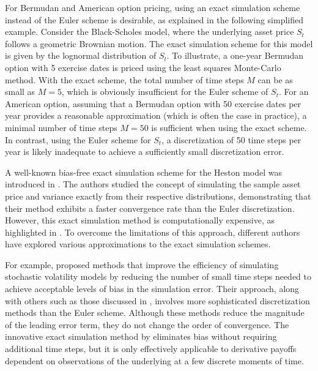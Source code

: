 \documentclass[]{interact}
\theoremstyle{plain}%
\theoremstyle{definition}
\theoremstyle{remark}
\begin{document}
For Bermudan and American option pricing, using an exact simulation scheme instead of the Euler scheme is desirable, as explained in the following simplified example. Consider the Black-Scholes model, where the underlying asset price $S_t$ follows a geometric Brownian motion. The exact simulation scheme for this model is given by the lognormal distribution of $S_t$. To illustrate, a one-year Bermudan option with 5 exercise dates is priced using the least squares Monte-Carlo method. With the exact scheme, the total number of time steps $M$ can be as small as $M = 5$, which is obviously insufficient for the Euler scheme of $S_t$. For an American option, assuming that a Bermudan option with 50 exercise dates per year provides a reasonable approximation (which is often the case in practice), a minimal number of time steps $M = 50$ is sufficient when using the exact scheme. In contrast, using the Euler scheme for $S_t$, a discretization of 50 time steps per year is likely inadequate to achieve a sufficiently small discretization error.




A well-known bias-free exact simulation scheme for the Heston model was introduced in \cite{broadie2006exact}. The authors studied the concept of simulating the sample asset price and variance exactly from their respective distributions, demonstrating that their method exhibits a faster convergence rate than the Euler discretization. However, this exact simulation method is computationally expensive, as highlighted in \cite{andersen2007efficient,lordetal}. To overcome the limitations of this approach, different authors \cite{smith2007almost,andersen2007efficient,chan2010fast,glasserman2011gamma,grzelak2019stochastic} have explored various approximations to the exact simulation schemes.

For example, \cite{smith2007almost} proposed methods that improve the efficiency of simulating stochastic volatility models by reducing the number of small time steps needed to achieve acceptable levels of bias in the simulation error. Their approach, along with others such as those discussed in \cite{chan2010fast,glasserman2011gamma}, involves more sophisticated discretization methods than the Euler scheme. Although these methods reduce the magnitude of the leading error term, they do not change the order of convergence. The innovative exact simulation method by \cite{broadie2006exact} eliminates bias without requiring additional time steps, but it is only effectively applicable to derivative payoffs dependent on observations of the underlying at a few discrete moments of time. 
\end{document}
